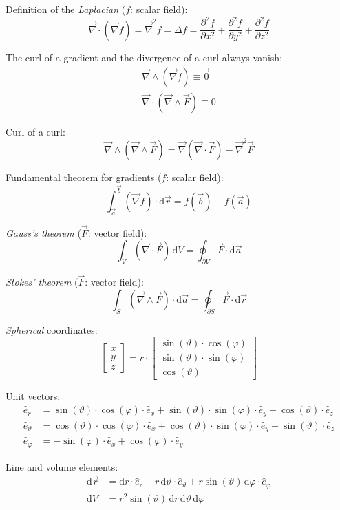 \documentclass[fontsize=11pt,a4paper]{scrartcl}
\begin{document}
Definition of the \emph{Laplacian} ($f$: scalar field):
\[
	\vec\nabla\cdot(\vec\nabla f) = \vec\nabla^2 f = \Delta f = \frac{\partial^2 f}{\partial x^2} + \frac{\partial^2 f}{\partial y^2} + \frac{\partial^2 f}{\partial z^2}
\]

The curl of a gradient and the divergence of a curl always vanish:
\begin{gather*}
	\vec\nabla\wedge(\vec\nabla f)\equiv\vec 0\\
	\vec\nabla\cdot(\vec\nabla\wedge\vec F)\equiv 0
\end{gather*}

Curl of a curl:
\[
	\vec\nabla\wedge(\vec\nabla\wedge\vec F) = \vec\nabla(\vec\nabla\cdot\vec F) - \vec\nabla^2\vec F
\]

Fundamental theorem for gradients ($f$: scalar field):
\[
	\int_{\vec a}^{\vec b} (\vec\nabla f)\cdot\mathrm{d}\vec r = f(\vec b) - f(\vec a)
\]

\emph{Gauss's theorem} ($\vec F$: vector field):
\[
	\int_V(\vec\nabla\cdot\vec F)\,\mathrm{d}V = \oint_{\partial V}\vec F\cdot\mathrm{d}\vec a
\]

\emph{Stokes' theorem} ($\vec F$: vector field):
\[
	\int_S(\vec\nabla\wedge\vec F)\cdot\mathrm{d}\vec a = \oint_{\partial S}\vec F\cdot\mathrm{d}\vec r
\]

\emph{Spherical} coordinates:
\[
	\begin{bmatrix}x\\ y\\ z\end{bmatrix} =
	r\cdot\begin{bmatrix}\sin(\vartheta)\cdot\cos(\varphi)\\ \sin(\vartheta)\cdot\sin(\varphi)\\ \cos(\vartheta)\end{bmatrix}
\]

Unit vectors:
\begin{align*}
	\hat e_r &= \sin(\vartheta)\cdot\cos(\varphi)\cdot\hat e_x + \sin(\vartheta)\cdot\sin(\varphi)\cdot\hat e_y + \cos(\vartheta)\cdot\hat e_z\\
	\hat e_\vartheta &= \cos(\vartheta)\cdot\cos(\varphi)\cdot\hat e_x + \cos(\vartheta)\cdot\sin(\varphi)\cdot\hat e_y - \sin(\vartheta)\cdot\hat e_z\\
	\hat e_\varphi &= -\sin(\varphi)\cdot\hat e_x + \cos(\varphi)\cdot\hat e_y
\end{align*}

Line and volume elements:
\begin{align*}
	\mathrm{d}\vec r &= \mathrm{d}r\cdot\hat e_r + r\,\mathrm{d}\vartheta\cdot\hat e_\vartheta + r\sin(\vartheta)\,\mathrm{d}\varphi\cdot\hat e_\varphi\\
	\mathrm{d}V &= r^2\sin(\vartheta)\,\mathrm{d}r\,\mathrm{d}\vartheta\,\mathrm{d}\varphi
\end{align*}
\end{document}
